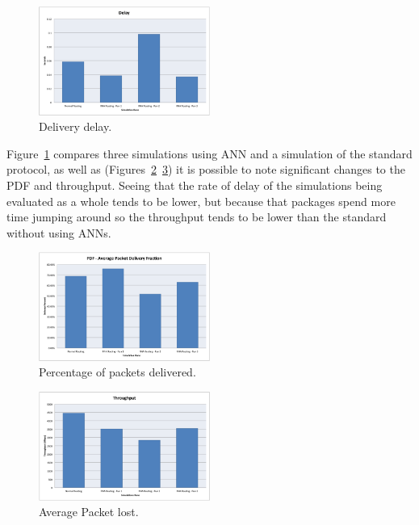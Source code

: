 \documentclass[10pt, conference, compsocconf]{IEEEtran}
\begin{document}
\begin{figure}[h]
	\centering
	\includegraphics[width=0.5\textwidth]{./graphics/image013.png}
    \caption{ Delivery delay.}
    \label{fig:g13}
\end{figure}

Figure~\ref{fig:g13} compares three simulations using ANN and a simulation of the standard protocol, as well as (Figures~\ref{fig:g14}~\ref{fig:g15}) it is possible to note significant changes to the PDF and throughput. Seeing that the rate of delay of the simulations being evaluated as a whole tends to be lower, but because that packages spend more time jumping around so the throughput tends to be lower than the standard without using ANNs.

\begin{figure}[h]
	\centering
	\includegraphics[width=0.5\textwidth]{./graphics/image014.png}
    \caption{ Percentage of packets delivered.}
    \label{fig:g14}
\end{figure}

\begin{figure}[h]
	\centering
	\includegraphics[width=0.5\textwidth]{./graphics/image015.png}
    \caption{ Average Packet lost.}
    \label{fig:g15}
\end{figure}
\end{document}
